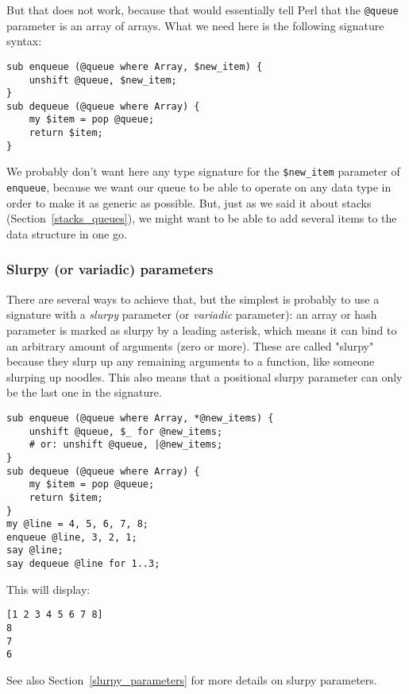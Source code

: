 But that does not work, because that would essentially tell 
Perl that the \verb'@queue' parameter is an array of arrays. 
What we need here is the following signature syntax:

\begin{verbatim}
sub enqueue (@queue where Array, $new_item) {
    unshift @queue, $new_item;
}
sub dequeue (@queue where Array) {
    my $item = pop @queue;
    return $item;
}
\end{verbatim}

We probably don't want here any type signature for the \verb'$new_item' parameter of {\tt enqueue}, because we want 
our queue to be able to operate on any data type in order to 
make it as generic as possible. But, just as we said it 
about stacks (Section~\ref{stacks_queues}), we might want to 
be able to add several items to the data structure in one go. 

\subsubsection{Slurpy (or variadic) parameters}

There are several ways to achieve that, but the simplest is 
probably to use a signature with a \emph{slurpy} parameter 
(or \emph{variadic} parameter): an array or hash parameter is 
marked as slurpy by a leading asterisk, which means it can 
bind to an arbitrary amount of arguments (zero or more). These 
are called "slurpy" because they slurp up any remaining 
arguments to a function, like someone slurping up noodles. This 
also means that a positional slurpy parameter can only be the last 
one in the signature.

\begin{verbatim}
sub enqueue (@queue where Array, *@new_items) {
    unshift @queue, $_ for @new_items;
    # or: unshift @queue, |@new_items;
}
sub dequeue (@queue where Array) {
    my $item = pop @queue;
    return $item;
}
my @line = 4, 5, 6, 7, 8;
enqueue @line, 3, 2, 1;
say @line;
say dequeue @line for 1..3;
\end{verbatim}

This will display:

\begin{verbatim}
[1 2 3 4 5 6 7 8]
8
7
6
\end{verbatim}

See also Section~\ref{slurpy_parameters} for more details 
on slurpy parameters.

